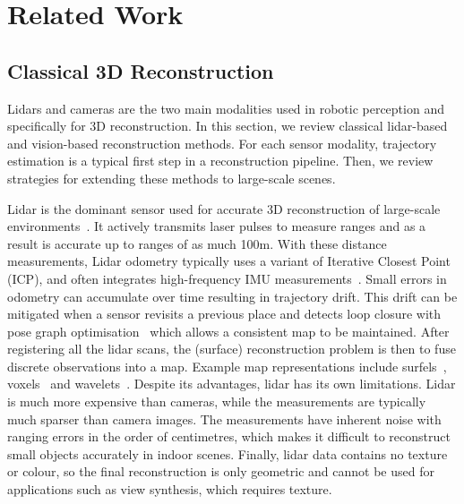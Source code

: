 \section{Related Work}
\label{sec:related_works}

\subsection{Classical 3D Reconstruction}
Lidars and cameras are the two main modalities used in robotic perception and specifically for 3D reconstruction. In this section, we review classical lidar-based and vision-based reconstruction methods. For each sensor modality, trajectory estimation is a typical first step in a reconstruction pipeline. Then, we review strategies for extending these methods to large-scale scenes.

Lidar is the dominant sensor used for accurate 3D reconstruction of large-scale environments~\cite{behley2018rss, lin2022r3live}. It actively transmits laser pulses to measure ranges and as a result is accurate up to ranges of as much 100m. With these distance measurements, Lidar odometry typically uses a variant of Iterative Closest Point (ICP), and often integrates high-frequency IMU measurements~\cite{zhang2014loam, zhao2021super, xu2022fast, wisth2023vilens}. Small errors in odometry can accumulate over time resulting in trajectory drift. This drift can be mitigated when a sensor revisits a previous place and detects loop closure with pose graph optimisation~\cite{thrun2006graph} which allows a consistent map to be maintained.
After registering all the lidar scans, the (surface) reconstruction problem is then to fuse discrete observations into a map. %
Example map representations include surfels~\cite{whelan2016elasticfusion,park2018elastic}, voxels~\cite{hornung13octomap,newcombe2011kinectfusion,oleynikova2017voxblox,Vespa2018supereight} and wavelets~\cite{reijgwart2023wavemap}. 
Despite its advantages, lidar has its own limitations. Lidar is much more expensive than cameras, while the measurements are typically much sparser than camera images. The measurements have inherent noise with ranging errors in the order of centimetres, which makes it difficult to reconstruct small objects accurately in indoor scenes. Finally, lidar data contains no texture or colour, so the final reconstruction is only geometric and cannot be used for applications such as view synthesis, which requires texture.

